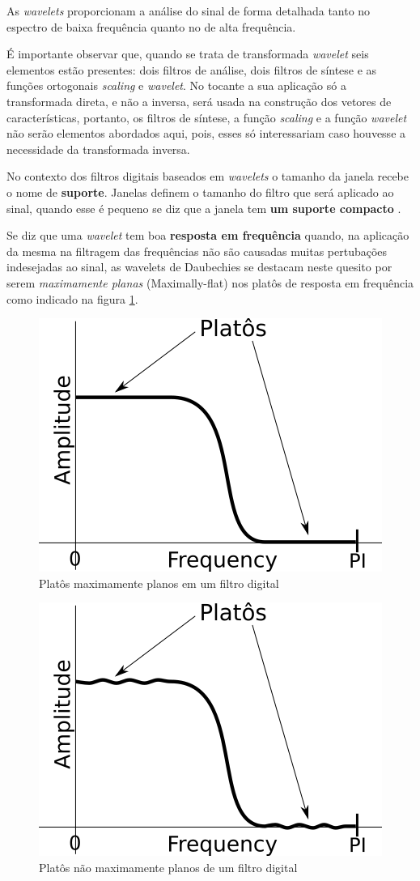 			\par As \textit{wavelets} proporcionam a análise do sinal de forma detalhada tanto no espectro de baixa frequência quanto no de alta frequência.
			
			\par É importante observar que, quando se trata de transformada \textit{wavelet} seis elementos estão presentes: dois filtros de análise, dois filtros de síntese e as funções ortogonais \textit{scaling} e \textit{wavelet}. No tocante a sua aplicação só a transformada direta, e não a inversa, será usada na construção dos vetores de características, portanto, os filtros de síntese, a função \textit{scaling} e a função \textit{wavelet} não serão elementos abordados aqui, pois, esses só interessariam caso houvesse a necessidade da transformada inversa.

			\par No contexto dos filtros digitais baseados em \textit{wavelets} o tamanho da janela recebe o nome de \textbf{suporte}. Janelas definem o tamanho do filtro que será aplicado ao sinal, quando esse é pequeno se diz que a janela tem \textbf{um suporte compacto} \cite{robi2003}.
		
			\par Se diz que uma \textit{wavelet} tem boa \textbf{resposta em frequência} quando, na aplicação da mesma na filtragem das frequências não são causadas muitas pertubações indesejadas ao sinal, as wavelets de Daubechies se destacam neste quesito por serem \textit{maximamente planas} (Maximally-flat) nos platôs de resposta em frequência como indicado na figura \ref{fig:daubechies}.

			\begin{figure}[h]
				\centering
				\includegraphics[width=0.3\linewidth]{images/daubechies}
				\caption{Platôs maximamente planos em um filtro digital}
				\label{fig:daubechies}
			\end{figure}

			\begin{figure}[h]
				\centering
				\includegraphics[width=0.3\linewidth]{images/noMaximallyFlat}
				\caption{Platôs não maximamente planos de um filtro digital}
				\label{fig:nomaximallyflat}
			\end{figure}
		
